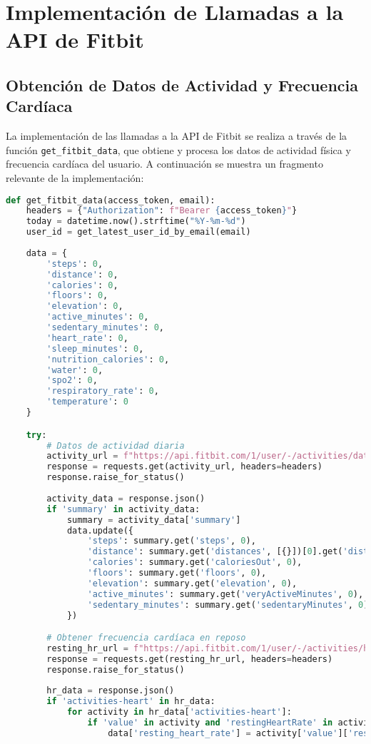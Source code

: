 \section{Implementación de Llamadas a la API de Fitbit}
\label{sec:anexo_fitbit}

\subsection{Obtención de Datos de Actividad y Frecuencia Cardíaca}
La implementación de las llamadas a la API de Fitbit se realiza a través de la función \texttt{get\_fitbit\_data}, que obtiene y procesa los datos de actividad física y frecuencia cardíaca del usuario. A continuación se muestra un fragmento relevante de la implementación:

\begin{lstlisting}[language=Python, caption=Implementación de la obtención de datos de Fitbit]
def get_fitbit_data(access_token, email):
    headers = {"Authorization": f"Bearer {access_token}"}
    today = datetime.now().strftime("%Y-%m-%d")
    user_id = get_latest_user_id_by_email(email)
    
    data = {
        'steps': 0,
        'distance': 0,
        'calories': 0,
        'floors': 0,
        'elevation': 0,
        'active_minutes': 0,
        'sedentary_minutes': 0,
        'heart_rate': 0,
        'sleep_minutes': 0,
        'nutrition_calories': 0,
        'water': 0,
        'spo2': 0,
        'respiratory_rate': 0,
        'temperature': 0
    }

    try:
        # Datos de actividad diaria
        activity_url = f"https://api.fitbit.com/1/user/-/activities/date/{today}.json"
        response = requests.get(activity_url, headers=headers)
        response.raise_for_status()
        
        activity_data = response.json()
        if 'summary' in activity_data:
            summary = activity_data['summary']
            data.update({
                'steps': summary.get('steps', 0),
                'distance': summary.get('distances', [{}])[0].get('distance', 0),
                'calories': summary.get('caloriesOut', 0),
                'floors': summary.get('floors', 0),
                'elevation': summary.get('elevation', 0),
                'active_minutes': summary.get('veryActiveMinutes', 0),
                'sedentary_minutes': summary.get('sedentaryMinutes', 0)
            })

        # Obtener frecuencia cardíaca en reposo
        resting_hr_url = f"https://api.fitbit.com/1/user/-/activities/heart/date/{today}/1d.json"
        response = requests.get(resting_hr_url, headers=headers)
        response.raise_for_status()
        
        hr_data = response.json()
        if 'activities-heart' in hr_data:
            for activity in hr_data['activities-heart']:
                if 'value' in activity and 'restingHeartRate' in activity['value']:
                    data['resting_heart_rate'] = activity['value']['restingHeartRate']
\end{lstlisting}

